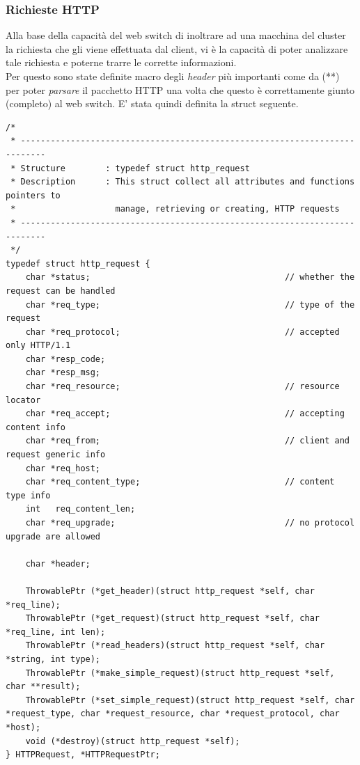 \documentclass[italian]{tktltiki2}
\begin{document}
\subsubsection*{Richieste HTTP}
Alla base della capacità del web switch di inoltrare ad una macchina del cluster la richiesta che gli viene effettuata dal client, vi è la capacità di poter analizzare tale richiesta e poterne trarre le corrette informazioni. \\
Per questo sono state definite macro degli \emph{header} più importanti come da (**) per poter \emph{parsare} il pacchetto HTTP una volta che questo è correttamente giunto (completo) al web switch. E' stata quindi definita la struct seguente.
\begin{lstlisting}
/*
 * ---------------------------------------------------------------------------
 * Structure        : typedef struct http_request
 * Description      : This struct collect all attributes and functions pointers to
 *                    manage, retrieving or creating, HTTP requests
 * ---------------------------------------------------------------------------
 */
typedef struct http_request {
    char *status;                                       // whether the request can be handled
    char *req_type;                                     // type of the request
    char *req_protocol;                                 // accepted only HTTP/1.1
    char *resp_code;
    char *resp_msg;
    char *req_resource;                                 // resource locator
    char *req_accept;                                   // accepting content info
    char *req_from;                                     // client and request generic info
    char *req_host;
    char *req_content_type;                             // content type info
    int   req_content_len;
    char *req_upgrade;                                  // no protocol upgrade are allowed

    char *header;                                

    ThrowablePtr (*get_header)(struct http_request *self, char *req_line);
    ThrowablePtr (*get_request)(struct http_request *self, char *req_line, int len);
    ThrowablePtr (*read_headers)(struct http_request *self, char *string, int type);
    ThrowablePtr (*make_simple_request)(struct http_request *self, char **result);
    ThrowablePtr (*set_simple_request)(struct http_request *self, char *request_type, char *request_resource, char *request_protocol, char *host);
    void (*destroy)(struct http_request *self);
} HTTPRequest, *HTTPRequestPtr;

\end{lstlisting}
\end{document}
